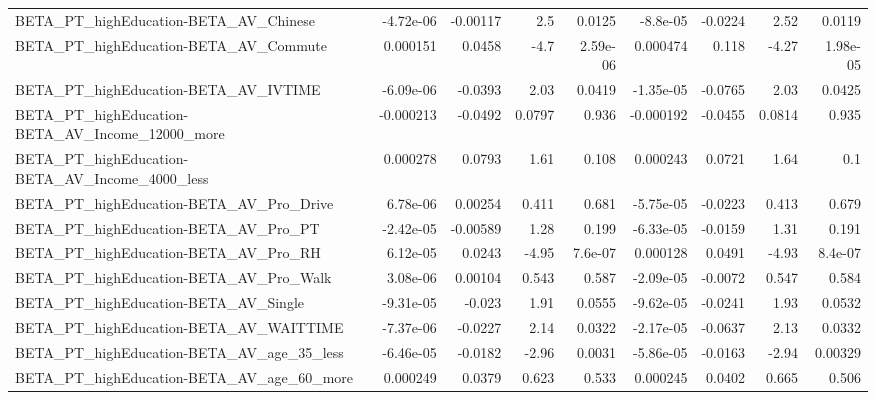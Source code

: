 \begin{tabular}{lrrrrrrrr}
BETA\_PT\_highEducation-BETA\_AV\_Chinese              &   -4.72e-06 &     -0.00117 &       2.5 &   0.0125 &   -8.8e-05 &     -0.0224 &         2.52 &        0.0119 \\
BETA\_PT\_highEducation-BETA\_AV\_Commute              &    0.000151 &       0.0458 &      -4.7 & 2.59e-06 &   0.000474 &       0.118 &        -4.27 &      1.98e-05 \\
BETA\_PT\_highEducation-BETA\_AV\_IVTIME               &   -6.09e-06 &      -0.0393 &      2.03 &   0.0419 &  -1.35e-05 &     -0.0765 &         2.03 &        0.0425 \\
BETA\_PT\_highEducation-BETA\_AV\_Income\_12000\_more    &   -0.000213 &      -0.0492 &    0.0797 &    0.936 &  -0.000192 &     -0.0455 &       0.0814 &         0.935 \\
BETA\_PT\_highEducation-BETA\_AV\_Income\_4000\_less     &    0.000278 &       0.0793 &      1.61 &    0.108 &   0.000243 &      0.0721 &         1.64 &           0.1 \\
BETA\_PT\_highEducation-BETA\_AV\_Pro\_Drive            &    6.78e-06 &      0.00254 &     0.411 &    0.681 &  -5.75e-05 &     -0.0223 &        0.413 &         0.679 \\
BETA\_PT\_highEducation-BETA\_AV\_Pro\_PT               &   -2.42e-05 &     -0.00589 &      1.28 &    0.199 &  -6.33e-05 &     -0.0159 &         1.31 &         0.191 \\
BETA\_PT\_highEducation-BETA\_AV\_Pro\_RH               &    6.12e-05 &       0.0243 &     -4.95 &  7.6e-07 &   0.000128 &      0.0491 &        -4.93 &       8.4e-07 \\
BETA\_PT\_highEducation-BETA\_AV\_Pro\_Walk             &    3.08e-06 &      0.00104 &     0.543 &    0.587 &  -2.09e-05 &     -0.0072 &        0.547 &         0.584 \\
BETA\_PT\_highEducation-BETA\_AV\_Single               &   -9.31e-05 &       -0.023 &      1.91 &   0.0555 &  -9.62e-05 &     -0.0241 &         1.93 &        0.0532 \\
BETA\_PT\_highEducation-BETA\_AV\_WAITTIME             &   -7.37e-06 &      -0.0227 &      2.14 &   0.0322 &  -2.17e-05 &     -0.0637 &         2.13 &        0.0332 \\
BETA\_PT\_highEducation-BETA\_AV\_age\_35\_less          &   -6.46e-05 &      -0.0182 &     -2.96 &   0.0031 &  -5.86e-05 &     -0.0163 &        -2.94 &       0.00329 \\
BETA\_PT\_highEducation-BETA\_AV\_age\_60\_more          &    0.000249 &       0.0379 &     0.623 &    0.533 &   0.000245 &      0.0402 &        0.665 &         0.506 \\

\end{tabular}
